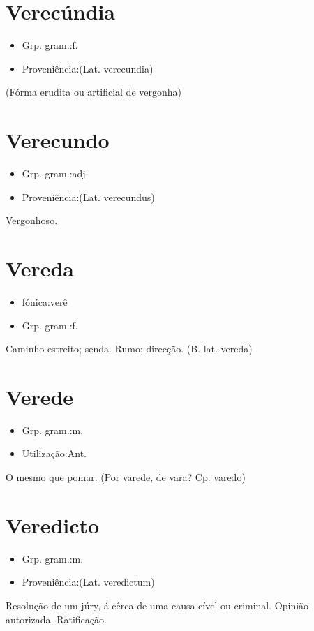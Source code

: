 \documentclass{article}
\begin{document}
\section{Verecúndia}
\begin{itemize}
\item {Grp. gram.:f.}
\end{itemize}
\begin{itemize}
\item {Proveniência:(Lat. \textunderscore verecundia\textunderscore )}
\end{itemize}
(Fórma erudita ou artificial de \textunderscore vergonha\textunderscore )
\section{Verecundo}
\begin{itemize}
\item {Grp. gram.:adj.}
\end{itemize}
\begin{itemize}
\item {Proveniência:(Lat. \textunderscore verecundus\textunderscore )}
\end{itemize}
Vergonhoso.
\section{Vereda}
\begin{itemize}
\item {fónica:verê}
\end{itemize}
\begin{itemize}
\item {Grp. gram.:f.}
\end{itemize}
Caminho estreito; senda.
Rumo; direcção.
(B. lat. \textunderscore vereda\textunderscore )
\section{Verede}
\begin{itemize}
\item {Grp. gram.:m.}
\end{itemize}
\begin{itemize}
\item {Utilização:Ant.}
\end{itemize}
O mesmo que \textunderscore pomar\textunderscore .
(Por \textunderscore varede\textunderscore , de \textunderscore vara\textunderscore ? Cp. \textunderscore varedo\textunderscore )
\section{Veredicto}
\begin{itemize}
\item {Grp. gram.:m.}
\end{itemize}
\begin{itemize}
\item {Proveniência:(Lat. \textunderscore veredictum\textunderscore )}
\end{itemize}
Resolução de um júry, á cêrca de uma causa cível ou criminal.
Opinião autorizada.
Ratificação.
\end{document}
